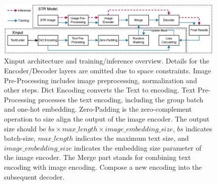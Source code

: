 \documentclass[runningheads]{llncs}
\begin{document}
\begin{figure}
  \centering
  \includegraphics[scale=0.15]{./images/xinput_structure.eps}
  \caption{
    Xinput architecture and training/inference overview. Details for the Encoder/Decoder layers are omitted due to space constraints. Image Pre-Processing includes image preprocessing, normalization and other steps. Dict Encoding converts the Text to encoding. Text Pre-Processing processes the text encoding, including the group batch and one-hot embedding. Zero-Padding is the zero-complement operation to size align the output of the image encoder. The output size should be $bs \times max\_length \times image\_embedding\_size$, $bs$ indicates batch-size, $max\_length$ indicates the maximum text size, and $image\_embedding\_size$ indicates the embedding size parameter of the image encoder. The Merge part stands for combining text encoding with image encoding. Compose a new encoding into the subsequent decoder.}
  \label{Fig:xinput}
  \end{figure}
\end{document}
